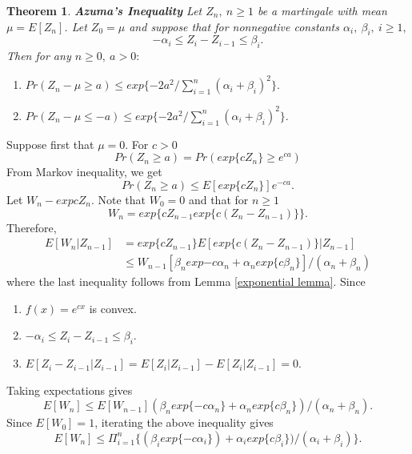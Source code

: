 \documentclass[a4paper,10pt]{article}
\theoremstyle{plain}
\newtheorem{thm}{Theorem}[section]
\theoremstyle{definition}
\theoremstyle{remark}
\begin{document}
\begin{thm}
\textbf{Azuma's Inequality} Let $Z_n,~ n\geq 1$ be a martingale with mean $\mu= E[Z_n]$. Let $Z_0= \mu$ and suppose that for nonnegative constants $\alpha_i,~\beta_i,~ i \geq 1,$
\begin{equation*}
-\alpha_i \leq Z_i-Z_{i-1} \leq \beta_i.
\end{equation*}
Then for any $n \geq 0, ~a >0 :$
\begin{enumerate}
\item $Pr(Z_n - \mu \geq a) \leq exp\{-2a^2/ \sum_{i=1}^{n}(\alpha_i+\beta_i)^2\}.$
\item $Pr(Z_n - \mu \leq -a) \leq exp\{-2a^2/ \sum_{i=1}^{n}(\alpha_i+\beta_i)^2\}.$
\end{enumerate}
\end{thm}
Suppose first that $\mu=0$. For $c>0$
\begin{equation*}
Pr(Z_n \geq a) = Pr(exp\{cZ_n\} \geq e^{ca})
\end{equation*}
From Markov inequality, we get
\begin{equation}
\label{Markov Inequality: Azuma}
Pr(Z_n \geq a)  \leq E[exp\{cZ_n\}]e^{-ca}.
\end{equation}
Let $W_n-exp{cZ_n}$. Note that $W_0=0$ and that for $n \geq 1$
\begin{equation*}
W_n=exp\{cZ_{n-1}exp\{c(Z_n-Z_{n-1})\}\}.
\end{equation*}
Therefore, 
\begin{eqnarray*}
E[W_n|Z_{n-1}]&=exp\{cZ_{n-1}\}E[exp\{c(Z_n-Z_{n-1})\}|Z_{n-1}]\\
& \leq W_{n-1}[\beta_n exp{-c\alpha_n}+\alpha_n exp\{c\beta_n\}]/(\alpha_n+\beta_n)
\end{eqnarray*}
where the last inequality follows from Lemma \ref{exponential lemma}. Since 
\begin{enumerate}
\item $f(x) =e^{cx}$ is convex.
\item $-\alpha_i \leq Z_i-Z_{i-1} \leq \beta_i.$
\item $E[Z_i-Z_{i-1}|Z_{i-1}]=E[Z_i|Z_{i-1}]-E[Z_i|Z_{i-1}] = 0$.
\end{enumerate}
Taking expectations gives
\begin{equation*}
E[W_n] \leq E[W_{n-1}](\beta_nexp\{-c \alpha_n\}+\alpha_n exp\{c\beta_n\})/(\alpha_n+\beta_n).
\end{equation*}
Since $E[W_0]=1$, iterating the above inequality gives
\begin{equation*}
E[W_n] \leq \Pi_{i=1}^{n}\{(\beta_iexp\{-c\alpha_i\})+\alpha_i exp\{c\beta_i\})/(\alpha_i+\beta_i)\}.
\end{equation*}
\end{document}
